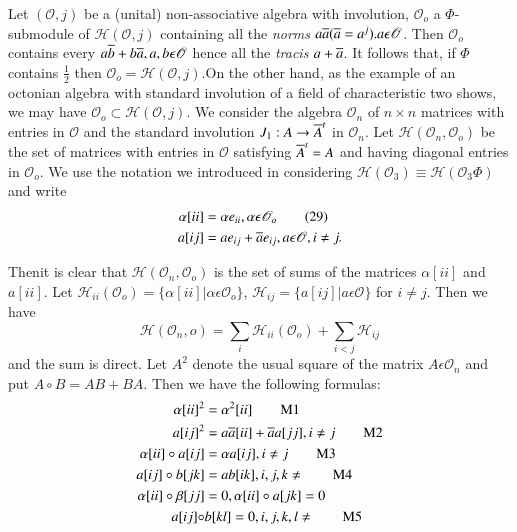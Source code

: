 Let $(\mathscr{O},j)$ be a (unital) non-associative algebra with
involution, $\mathscr{O}_o$ a $\Phi$-submodule of
$\mathscr{H}(\mathscr{O},j)$ containing all the {\em norms} $a
\overline{a}(\overline{a}=a^{j}).a\epsilon \mathscr{O}$. Then $\mathscr{O}_o$
contains every $a\overline{b}+b\overline{a}, a,b \epsilon \mathscr{O}$ hence all
the {\em tracis} $a+\overline{a}$. It follows that, if $\Phi$ contains
$\frac{1}{2}$ then $\mathscr{O}_o=\mathscr{H}(\mathscr{O},j)$.On the
other hand, as the example of an octonian algebra with standard
involution of a field of characteristic two shows, we may have
$\mathscr{O}_o\subset\mathscr{H}(\mathscr{O},j)$. We consider the
algebra $\mathscr{O}_n$ of $n\times n$ matrices with entries in
$\mathscr{O}$ and the standard involution $J_1:A\to \overline{A}^t$ in
$\mathscr{O}_n$. Let $\mathscr{H}(\mathscr{O}_n,\mathscr{O}_o)$ be
the set of matrices with entries in $\mathscr{O}$ satisfying
$\overline{A}^{t}=A$ and having diagonal entries in $\mathscr{O}_o$. We use
the notation we introduced in considering
$\mathscr{H}(\mathscr{O}_3)\equiv\mathscr{H}(\mathscr{O}_3\Phi)$ and
write
\begin{align*}
  \alpha[ii]&=\alpha e_{ii},\alpha \epsilon
  \mathscr{O}_o\tag{29}\label{c2:eq29} \\
  a[ij]&=ae_{ij}+\overline{a}e_{ij},a\epsilon \mathscr{O},i\neq j.
\end{align*}

Then\pageoriginale it is clear that
$\mathscr{H}(\mathscr{O}_n,\mathscr{O}_o)$ is the set of sums of the
matrices $\alpha[ii]$ and $a[ii]$. Let
$\mathscr{H}_{ii}(\mathscr{O}_o)=\{\alpha[ii]|\alpha\epsilon
\mathscr{O}_o\}$, $\mathscr{H}_{ij}=\{a[ij]|a\epsilon \mathscr{O}\}$
for $i\neq j$. Then we have
\begin{equation*}
  \mathscr{H}(\mathscr{O}_n,o)=\sum\limits_{i} \mathscr{H}_{ii}
  (\mathscr{O}_o) +\sum\limits_{i<j}\mathscr{H}_{ij}\tag{30}\label{c2:eq30}
\end{equation*}
and the sum is direct. Let $A^{2}$ denote the usual square of the
matrix $A\epsilon \mathscr{O}_n$ and put $A\circ B=AB+BA$. Then we
have the following formulas:
\begin{align*}
\alpha[ii]^{2}&=\alpha^{2}[ii]\tag*{M1}\\
a[ij]^{2}&=a\overline{a}[ii]+\overline{a}a[jj],i\neq j\tag*{M2}\\
\alpha[ii]\circ a[ij]&=\alpha a[ij],i\neq j\tag*{M3}\\
a[ij]\circ b[jk]&=ab[ik],i,j,k\neq\tag*{M4}\\
\alpha[ii]\circ\beta[jj]&=0, \alpha[ii]\circ a[jk]=0\\
a[ij]\circ &b[kl]=0,i,j,k,l\neq\tag*{M5}
\end{align*}

